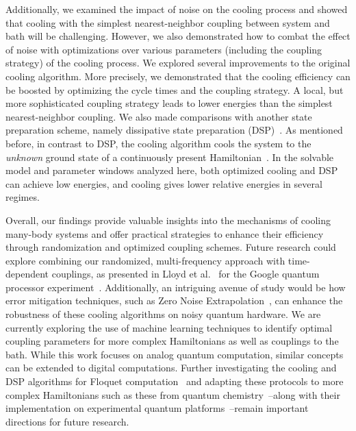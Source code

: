 \documentclass[aps,prx,twocolumn,superscriptaddress,nofootinbib,nolongbibliography,nobalancelastpage,10pt,floatfix]{revtex4-2}
\begin{document}
Additionally, we examined the impact of noise on the cooling process and showed that cooling with the simplest nearest-neighbor coupling between system and bath will be challenging. However, we also demonstrated how to combat the effect of noise with optimizations over various parameters (including the coupling strategy) of the cooling process. We explored several improvements to the original cooling algorithm. More precisely, we demonstrated that the cooling efficiency can be boosted by optimizing the cycle times and the coupling strategy. A local, but more sophisticated coupling strategy leads to lower energies than the simplest nearest-neighbor coupling. We also made comparisons with another state preparation scheme, namely dissipative state preparation (DSP)~\cite{Poyatos1996Quantum,Kraus2008Preparation,Diehl2008Quantum,Verstraete2009Quantuma}. As mentioned before, in contrast to DSP, the cooling algorithm cools the system to the {\it unknown} ground state of a continuously present Hamiltonian~\cite{Davies1974Markovian,Terhal2000Problem}. In the solvable model and parameter windows analyzed here, both optimized cooling and DSP can achieve low energies, and cooling gives lower relative energies in several regimes.

Overall, our findings provide valuable insights into the mechanisms of cooling many-body systems and offer practical strategies to enhance their efficiency through randomization and optimized coupling schemes.
Future research could explore combining our randomized, multi-frequency approach with time-dependent couplings, as presented in Lloyd et al.~\cite{Lloyd2025Quasiparticle} for the Google quantum processor experiment~\cite{Mi2024Stable}. Additionally, an intriguing avenue of study would be how error mitigation techniques, such as Zero Noise Extrapolation~\cite{Temme2017Error}, can enhance the robustness of these cooling algorithms on noisy quantum hardware. We are currently exploring the use of machine learning techniques to identify optimal coupling parameters for more complex Hamiltonians as well as couplings to the bath. While this work focuses on analog quantum computation, similar concepts can be extended to digital computations. Further investigating the cooling and DSP algorithms for Floquet computation~\cite{Lloyd2025Quasiparticle} and adapting these protocols to more complex Hamiltonians such as these from quantum chemistry~\cite{Li2024Dissipative}--along with their implementation on experimental quantum platforms~\cite{Barreiro2011Opensystem,Schindler2013Quantum,Ma2019Dissipatively}--remain important directions for future research.
\end{document}
